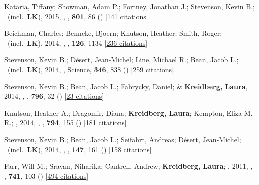 \item[{\color{numcolor}\scriptsize7}] Kataria, Tiffany; Showman, Adam P.; Fortney, Jonathan J.; Stevenson, Kevin B.; \etal\ (incl.\ \textbf{LK}), 2015, , \apj, \textbf{801}, 86 () [\href{https://ui.adsabs.harvard.edu/abs/2015ApJ...801...86K}{141 citations}]

\item[{\color{numcolor}\scriptsize6}] Beichman, Charles; Benneke, Bjoern; Knutson, Heather; Smith, Roger; \etal\ (incl.\ \textbf{LK}), 2014, , \pasp, \textbf{126}, 1134 [\href{https://ui.adsabs.harvard.edu/abs/2014PASP..126.1134B}{236 citations}]

\item[{\color{numcolor}\scriptsize5}] Stevenson, Kevin B.; D{\'e}sert, Jean-Michel; Line, Michael R.; Bean, Jacob L.; \etal\ (incl.\ \textbf{LK}), 2014, , Science, \textbf{346}, 838 () [\href{https://ui.adsabs.harvard.edu/abs/2014Sci...346..838S}{259 citations}]

\item[{\color{numcolor}\scriptsize4}] Stevenson, Kevin B.; Bean, Jacob L.; Fabrycky, Daniel; \& \textbf{Kreidberg, Laura}, 2014, , \apj, \textbf{796}, 32 () [\href{https://ui.adsabs.harvard.edu/abs/2014ApJ...796...32S}{23 citations}]

\item[{\color{numcolor}\scriptsize3}] Knutson, Heather A.; Dragomir, Diana; \textbf{Kreidberg, Laura}; Kempton, Eliza M.-R.; \etal, 2014, , \apj, \textbf{794}, 155 () [\href{https://ui.adsabs.harvard.edu/abs/2014ApJ...794..155K}{181 citations}]

\item[{\color{numcolor}\scriptsize2}] Stevenson, Kevin B.; Bean, Jacob L.; Seifahrt, Andreas; D{\'e}sert, Jean-Michel; \etal\ (incl.\ \textbf{LK}), 2014, , \aj, \textbf{147}, 161 () [\href{https://ui.adsabs.harvard.edu/abs/2014AJ....147..161S}{158 citations}]

\item[{\color{numcolor}\scriptsize1}] Farr, Will M.; Sravan, Niharika; Cantrell, Andrew; \textbf{Kreidberg, Laura}; \etal, 2011, , \apj, \textbf{741}, 103 () [\href{https://ui.adsabs.harvard.edu/abs/2011ApJ...741..103F}{494 citations}]